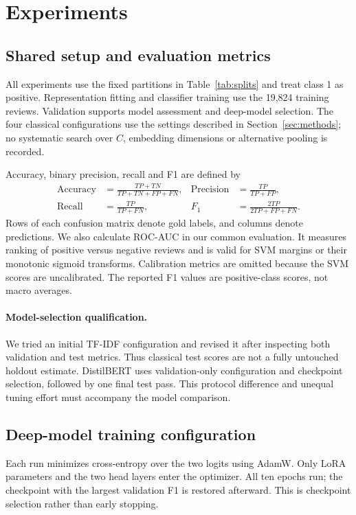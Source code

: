 \section{Experiments}\label{sec:experiments}
\subsection{Shared setup and evaluation metrics}
All experiments use the fixed partitions in Table~\ref{tab:splits} and treat
class 1 as positive. Representation fitting and classifier training use the
19,824 training reviews. Validation supports model assessment and deep-model
selection. The four classical configurations use the settings described in
Section~\ref{sec:methods}; no systematic search over $C$, embedding dimensions
or alternative pooling is recorded.

Accuracy, binary precision, recall and F1 are defined by
\begin{align}
 \operatorname{Accuracy}&=\frac{TP+TN}{TP+TN+FP+FN}, &
 \operatorname{Precision}&=\frac{TP}{TP+FP},\\
 \operatorname{Recall}&=\frac{TP}{TP+FN}, &
 F_1&=\frac{2TP}{2TP+FP+FN}.
\end{align}
Rows of each confusion matrix denote gold labels, and columns denote predictions.
We also calculate ROC-AUC in our common evaluation. It measures ranking of
positive versus negative reviews and is valid for SVM margins or their monotonic
sigmoid transforms. Calibration metrics are omitted because the SVM scores are
uncalibrated. The reported F1 values are positive-class scores, not macro averages.

\paragraph{Model-selection qualification.}
We tried an initial TF-IDF configuration and revised it after inspecting both
validation and test metrics. Thus classical test scores
are not a fully untouched holdout estimate. DistilBERT uses validation-only
configuration and checkpoint selection, followed by one final test pass. This
protocol difference and unequal tuning effort must accompany the model comparison.

\subsection{Deep-model training configuration}
Each run minimizes cross-entropy over the two logits using AdamW. Only LoRA
parameters and the two head layers enter the optimizer. All ten epochs run;
the checkpoint with the largest validation F1 is restored afterward. This is
checkpoint selection rather than early stopping.

